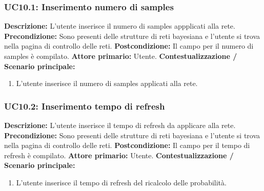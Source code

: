                 \subsubsection{UC10.1: Inserimento numero di samples}
                    \textbf{Descrizione:}  L’utente inserisce il numero di samples appplicati alla rete.
                    \newline
                    \textbf{Precondizione:} Sono presenti delle strutture di reti bayesiana e l'utente si trova nella pagina di controllo delle reti.
                    \newline
                    \textbf{Postcondizione:} Il campo per il numero di samples è compilato.
                    \newline
                    \textbf{Attore primario:} Utente.
                    \newline
                    \textbf{Contestualizzazione / Scenario principale:} \begin{enumerate}
                            \item L'utente inserisce il numero di samples applicati alla rete.
                        \end{enumerate}
                        
                \subsubsection{UC10.2: Inserimento tempo di refresh }
                    \textbf{Descrizione:}  L’utente inserisce il tempo di refresh  da applicare alla rete.
                    \newline
                    \textbf{Precondizione:} Sono presenti delle strutture di reti bayesiana e l'utente si trova nella pagina di controllo delle reti.
                    \newline
                    \textbf{Postcondizione:} Il campo per il tempo di refresh è compilato.
                    \newline
                    \textbf{Attore primario:} Utente.
                    \newline
                    \textbf{Contestualizzazione / Scenario principale:} \begin{enumerate}
                        \item L'utente inserisce il tempo di refresh del ricalcolo delle probabilità.                                 
                    \end{enumerate}
                        
